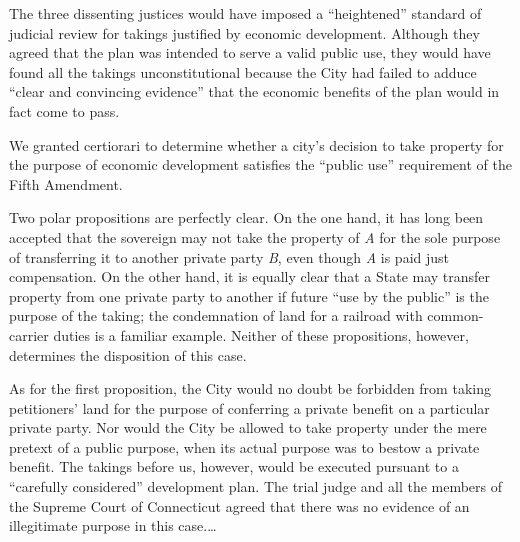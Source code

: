 The three dissenting justices would have imposed a ``heightened'' standard of
judicial review for takings justified by economic development. Although they
agreed that the plan was intended to serve a valid public use, they would have
found all the takings unconstitutional because the City had failed to adduce
``clear and convincing evidence'' that the economic benefits of the plan would
in fact come to pass. 

We granted certiorari to determine whether a city's decision to take property
for the purpose of economic development satisfies the ``public use'' requirement
of the Fifth Amendment. 



Two polar propositions are perfectly clear. On the one hand, it has long been
accepted that the sovereign may not take the property of \textit{A} for the sole
purpose of transferring it to another private party \textit{B}, even though
\textit{A} is paid just compensation. On the other hand, it is equally clear
that a State may transfer property from one private party to another if future
``use by the public'' is the purpose of the taking; the condemnation of land for
a railroad with common-carrier duties is a familiar example. Neither of these
propositions, however, determines the disposition of this case.

As for the first proposition, the City would no doubt be forbidden from taking
petitioners' land for the purpose of conferring a private benefit on a
particular private party. Nor would the City be allowed to take property under
the mere pretext of a public purpose, when its actual purpose was to bestow a
private benefit. The takings before us, however, would be executed pursuant to a
``carefully considered'' development plan. The trial judge and all the members
of the Supreme Court of Connecticut agreed that there was no evidence of an
illegitimate purpose in this case.\ldots

